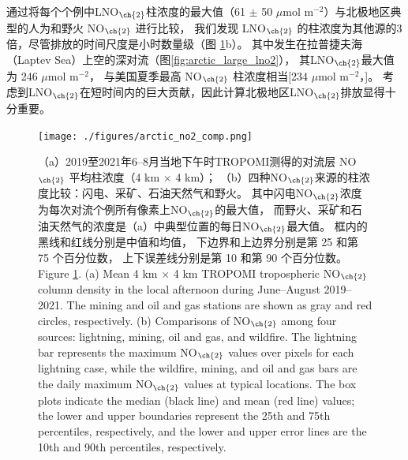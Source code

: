 通过将每个个例中LNO$_{\ch{2}}$柱浓度的最大值（61 $\pm$ 50 $\mu$mol m$^{-2}$）与北极地区典型的人为和野火 NO$_{\ch{2}}$ 进行比较，
我们发现 LNO$_{\ch{2}}$ 的柱浓度为其他源的3倍，尽管排放的时间尺度是小时数量级（图 \ref{fig:arctic_no2_comp}b）。
其中发生在拉普捷夫海（Laptev Sea）上空的深对流（图\ref{fig:arctic_large_lno2}），
其LNO$_{\ch{2}}$最大值 为 246 $\mu$mol m$^{-2}$，
与美国夏季最高 NO$_{\ch{2}}$ 柱浓度相当[234 $\mu$mol m$^{-2}$，\citet{Goldberg.2021a}]。
考虑到LNO$_{\ch{2}}$在短时间内的巨大贡献，因此计算北极地区LNO$_{\ch{2}}$排放显得十分重要。

\begin{figure}[H]
\centering
\texttt{[image: ./figures/arctic\_no2\_comp.png]}
\caption{
（a）2019至2021年6--8月当地下午时TROPOMI测得的对流层 NO$_{\ch{2}}$ 平均柱浓度（4 km $\times$ 4 km）；
（b）四种NO$_{\ch{2}}$来源的柱浓度比较：闪电、采矿、石油天然气和野火。
其中闪电NO$_{\ch{2}}$浓度为每次对流个例所有像素上NO$_{\ch{2}}$的最大值，
而野火、采矿和石油天然气的浓度是（a）中典型位置的每日NO$_{\ch{2}}$最大值。
框内的黑线和红线分别是中值和均值，
下边界和上边界分别是第 25 和第 75 个百分位数，
上下误差线分别是第 10 和第 90 个百分位数。\\
Figure \ref{fig:arctic_no2_comp}. (a) Mean 4 km $\times$ 4 km TROPOMI tropospheric NO$_{\ch{2}}$ column density in the local afternoon during June--August 2019--2021.
The mining and oil and gas stations are shown as gray and red circles, respectively.
(b) Comparisons of NO$_{\ch{2}}$ among four sources: lightning, mining, oil and gas, and wildfire.
The lightning bar represents the maximum NO$_{\ch{2}}$ values over pixels for each lightning case,
while the wildfire, mining, and oil and gas bars are the daily maximum NO$_{\ch{2}}$ values at typical locations.
The box plots indicate the median (black line) and mean (red line) values; the lower and upper boundaries represent the 25th and 75th percentiles, respectively, and the lower and upper error lines are the 10th and 90th percentiles, respectively.
}
\label{fig:arctic_no2_comp}
\end{figure}


